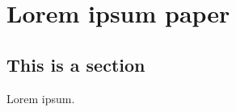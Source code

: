 \acresetall %
\chapter*{Lorem ipsum paper}


\begin{abstract}
	Abstract.
\end{abstract}


\section{This is a section}
\label{Paper2016Lorem:sec:introduction}

Lorem ipsum.